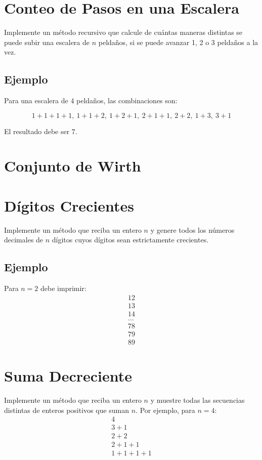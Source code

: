 \section{Conteo de Pasos en una Escalera}
Implemente un método recursivo que calcule de cuántas maneras distintas se puede subir una escalera de \( n \) peldaños, si se puede avanzar 1, 2 o 3 peldaños a la vez.  

\subsection*{Ejemplo}
Para una escalera de \( 4 \) peldaños, las combinaciones son:

\[
1+1+1+1,\ 1+1+2,\ 1+2+1,\ 2+1+1,\ 2+2,\ 1+3,\ 3+1
\]

El resultado debe ser \( 7 \).

\section{Conjunto de Wirth}  
  

\section{Dígitos Crecientes}  
Implemente un método que reciba un entero \( n \) y genere todos los números decimales de \( n \) dígitos cuyos dígitos sean estrictamente crecientes. 

\subsection*{Ejemplo}
Para \( n = 2 \) debe imprimir:  
\begin{equation}
    \begin{aligned}  
    12 \\ 
    13 \\ 
    14 \\ 
    \ldots \\ 
    78 \\
    79 \\
    89  
    \end{aligned}
\end{equation}

\section{Suma Decreciente}  
Implemente un método que reciba un entero \( n \) y muestre todas las secuencias distintas de enteros positivos que suman \( n \). Por ejemplo, para \( n = 4 \):  
\begin{equation}
    \begin{aligned}
    4 \\ 
    3+1 \\ 
    2+2 \\ 
    2+1+1 \\ 
    1+1+1+1   
    \end{aligned}
\end{equation}

